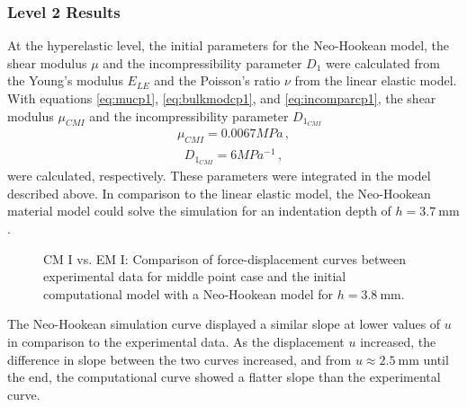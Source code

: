 \subsubsection*{Level 2 Results}
\label{subsection:level2cmI}
At the hyperelastic level, the initial parameters for the Neo-Hookean model, 
the shear modulus $\mu$ and the incompressibility parameter $D_1$ were calculated from the Young's modulus $E_{LE}$
and the Poisson's ratio $\nu$ from the linear elastic model. With equations \ref{eq:mucp1}, \ref{eq:bulkmodcp1}, 
and \ref{eq:incomparcp1}, the shear modulus $\mu_{CMI}$ and the incompressibility parameter $D_{1_{CMI}}$
\begin{align}
    \mu_{CMI} = 0.0067 MPa \, ,
    \label{eq:mucp1result}
\end{align}
\begin{align}
    D_{1_{CMI}} = 6 MPa^{-1} \, ,
    \label{eq:d1cp1result}
\end{align}
were calculated, respectively. These parameters were integrated in the model described above. In comparison to 
the linear elastic model, the Neo-Hookean material model could solve the simulation for an indentation depth of 
$h =  \SI{3.7}{\milli \meter}$.
\begin{figure}%
    \centering
   \quad
   \caption[Computational model I vs. Experimental data - Neo-Hookean]{CM I vs. EM I: Comparison of force-displacement curves between experimental data for middle point case and the initial computational model with a Neo-Hookean model for $h = \SI{3.8}{\milli \meter}$.}%
   \label{fig:MPIvsCPINH}%
\end{figure}
The Neo-Hookean simulation curve displayed a similar slope at lower values of $u$ in comparison to the experimental data.
As the displacement $u$ increased, the difference in slope between the two curves increased, and from $u \approx \SI{2.5}{\milli \meter}$
until the end, the computational curve showed a flatter slope than the experimental curve.\\

